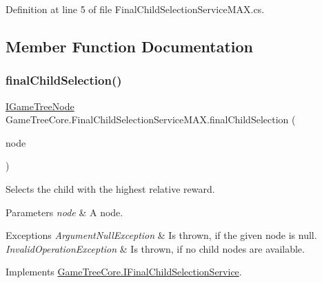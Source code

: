 Definition at line 5 of file Final\+Child\+Selection\+Service\+M\+A\+X.\+cs.



\subsection{Member Function Documentation}
\mbox{\label{class_game_tree_core_1_1_final_child_selection_service_m_a_x_a15781c79f5979e4e60968463dd112fe4}} 
\subsubsection{\texorpdfstring{final\+Child\+Selection()}{finalChildSelection()}}
{\footnotesize\ttfamily \mbox{\hyperlink{interface_game_tree_core_1_1_i_game_tree_node}{I\+Game\+Tree\+Node}} Game\+Tree\+Core.\+Final\+Child\+Selection\+Service\+M\+A\+X.\+final\+Child\+Selection (\begin{DoxyParamCaption}\item[{\mbox{\hyperlink{interface_game_tree_core_1_1_i_game_tree_node}{I\+Game\+Tree\+Node}}}]{node }\end{DoxyParamCaption})}



Selects the child with the highest relative reward. 


\begin{DoxyParams}{Parameters}
{\em node} & A node.\\
\hline
\end{DoxyParams}

\begin{DoxyExceptions}{Exceptions}
{\em Argument\+Null\+Exception} & Is thrown, if the given node is null.\\
\hline
{\em Invalid\+Operation\+Exception} & Is thrown, if no child nodes are available.\\
\hline
\end{DoxyExceptions}


Implements \mbox{\hyperlink{interface_game_tree_core_1_1_i_final_child_selection_service}{Game\+Tree\+Core.\+I\+Final\+Child\+Selection\+Service}}.



